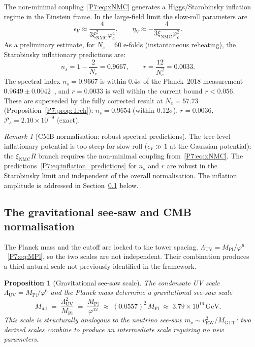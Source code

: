\documentclass[11pt,a4paper]{article}
\newtheorem{proposition}[theorem]{Proposition}
\theoremstyle{definition}
\theoremstyle{remark}
\newtheorem{remark}[theorem]{Remark}
\newcommand{\vp}{\varphi}
\newcommand{\MPl}{M_{\mathrm{Pl}}}
\newcommand{\LUV}{\Lambda_{\mathrm{UV}}}
\newcommand{\xNMC}{\xi_{\mathrm{NMC}}}
\begin{document}
The non-minimal coupling~\eqref{P7:eq:xNMC} generates a Higgs/Starobinsky
inflation regime in the Einstein frame.  In the large-field limit
the slow-roll parameters are
\begin{equation}
  \epsilon_V \approx \frac{4}{3\xNMC^2\varphi_c^4},
  \qquad
  \eta_V \approx -\frac{4}{3\xNMC\varphi_c^2}.
\end{equation}
As a preliminary estimate, for $N_e=60$ e-folds (instantaneous reheating),
the Starobinsky inflationary predictions are:
\begin{equation}
  n_s = 1 - \frac{2}{N_e} = 0.9667,
  \qquad
  r = \frac{12}{N_e^2} = 0.0033.
  \label{P7:eq:inflation_predictions}
\end{equation}
The spectral index $n_s=0.9667$ is within $0.4\sigma$ of the Planck~2018
measurement $0.9649\pm0.0042$~\cite{Planck2018}, and $r=0.0033$ is well
within the current bound $r<0.056$.
These are superseded by the fully corrected result at $N_e=57.73$
(Proposition~\ref{P7:prop:Treh}): $n_s=0.9654$ (within $0.12\sigma$),
$r=0.0036$, $\mathcal{P}_s=2.10\times10^{-9}$ (exact).

\begin{remark}[CMB normalisation: robust spectral predictions]
\label{P7:rem:inflation_gap}
The tree-level inflationary potential is too steep for slow roll
($\epsilon_V\gg1$ at the Gaussian potential): the $\xNMC R$ branch
requires the non-minimal coupling from~\eqref{P7:eq:xNMC}.
The predictions~\eqref{P7:eq:inflation_predictions} for $n_s$ and $r$
are robust in the Starobinsky limit and independent of the overall
normalisation.  The inflation amplitude is addressed in
Section~\ref{P7:sec:inflation_norm} below.
\end{remark}

\subsection{The gravitational see-saw and CMB normalisation}
\label{P7:sec:inflation_norm}

The Planck mass and the cutoff are locked to the tower spacing,
$\LUV=\MPl/\vp^6$~\eqref{P7:eq:MPl}, so the two scales are not
independent.  Their combination produces a third natural scale not
previously identified in the framework.

\begin{proposition}[Gravitational see-saw scale]
\label{P7:prop:seesaw}
The condensate UV scale $\LUV=\MPl/\vp^6$ and the Planck mass
determine a gravitational see-saw scale
\begin{equation}
  \boxed{M_{\mathrm{inf}} \;=\; \frac{\LUV^2}{\MPl}
  \;=\; \frac{\MPl}{\vp^{12}}
  \;\approx\; (0.0557)^2\,\MPl
  \;\approx\; 3.79\times10^{16}\,\mathrm{GeV}.}
  \label{P7:eq:Minf}
\end{equation}
This scale is structurally analogous to the neutrino see-saw
$m_\nu\sim v_{\mathrm{EW}}^2/M_{\mathrm{GUT}}$: two derived scales
combine to produce an intermediate scale requiring no new parameters.
\end{proposition}
\end{document}
